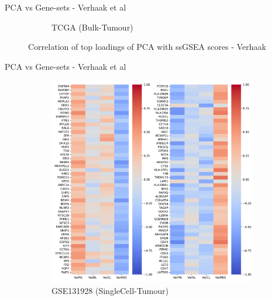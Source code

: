 \documentclass[aspectratio=169,9pt]{beamer}
\begin{document}
\begin{frame}{PCA vs Gene-sets - Verhaak et al}
\begin{adjustwidth}{-5cm}{-5cm}
\begin{figure}
\begin{subfigure}[c]{0.48\textwidth}
                    \caption{TCGA (Bulk-Tumour)}
                \end{subfigure}
                \caption{Correlation of top loadings of PCA with ssGSEA scores - Verhaak}
            \end{figure}
        \end{adjustwidth}
    \end{frame}

    \begin{frame}{PCA vs Gene-sets - Verhaak et al}
        \begin{adjustwidth}{-5cm}{-5cm}
            \centering
            \begin{figure}\ContinuedFloat
                \centering
                \begin{subfigure}[c]{0.48\textwidth}
                    \centering
                    \includegraphics[width=\textwidth]{GSM3828672_load-corr_Ver}
                    \caption{GSE131928 (SingleCell-Tumour)}
                \end{subfigure}
                \begin{subfigure}[c]{0.48\textwidth}
                    \centering

\end{subfigure}
\end{figure}
\end{adjustwidth}
\end{frame}
\end{document}
